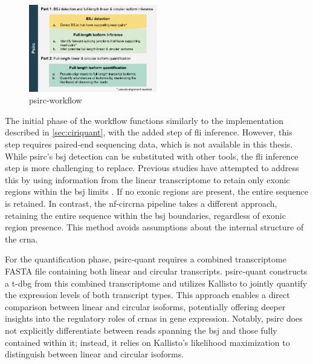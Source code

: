 \begin{figure}[ht] \centering

    \includegraphics[width=0.5\textwidth]{chapters/3_materials_and_methods/figures/psirc_pipeline.png}
    \caption{psirc-workflow} \label{fig:psirc_workflow} \end{figure}

The initial phase of the workflow functions similarly to the implementation
described in \cref{sec:ciriquant}, with the added step of \gls{fli} inference.
However, this step requires paired-end sequencing data, which is not available
in this thesis.
While \gls{psirc}'s \gls{bsj} detection can be substituted with other tools,
the \gls{fli} inference step is more challenging to replace.
Previous studies have attempted to address this by using information from the
linear transcriptome to retain only exonic regions within the \gls{bsj} limits
\supercite{hoffmann_circrna-sponging_2023}.
If no exonic regions are present, the entire sequence is retained.
In contrast, the \gls{nf-circrna} pipeline takes a different approach,
retaining the entire sequence within the \gls{bsj} boundaries, regardless of
exonic region presence.
This method avoids assumptions about the internal structure of the \gls{crna}.

For the quantification phase, \gls{psirc-quant} requires a combined
transcriptome FASTA file containing both linear and circular transcripts.
\Gls{psirc-quant} constructs a \gls{t-dbg} from this combined
transcriptome and utilizes Kallisto to jointly quantify the expression levels
of both transcript types\supercite{yu_quantifying_2021}.
This approach enables a direct comparison between linear and circular isoforms,
potentially offering deeper insights into the regulatory roles of \glspl{crna}
in gene expression.
Notably, \gls{psirc} does not explicitly differentiate between reads spanning
the \gls{bsj} and those fully contained within it; instead, it relies on
Kallisto's likelihood maximization to distinguish between linear and circular
isoforms\supercite{yu_quantifying_2021}.
